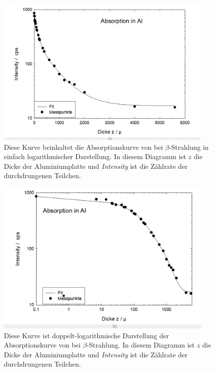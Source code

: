 \documentclass[12pt,english,ngerman]{scrartcl}
\begin{document}
\begin{figure}[H]
	\begin{center}
		\includegraphics[width = 0.95\textwidth]{figures/aluminiumabsorbtion.png}
	\end{center}
	\caption[Absorptionskurve von  bei $\beta$-Strahlung]{Diese Kurve beinhaltet die Absorptionskurve von  bei
		$\beta$-Strahlung in einfach logarithmischer Darstellung.
		In diesem Diagramm ist $z$ die Dicke der Aluminiumplatte und
		\emph{Intensity} ist die Zählrate der durchdrungenen Teilchen.
	}\label{fig:alu_absorption}
\end{figure}

\begin{figure}[H]
	\begin{center}
		\includegraphics[width = 0.95\textwidth]{figures/aluminiumdoppellog.png}
	\end{center}
	\caption[Doppelt-logarithmische Darstellung der Absorptionskurve von 
		bei $\beta$-Strahlung]{Diese Kurve ist doppelt-logarithmische Darstellung der Absorptionskurve von
		 bei $\beta$-Strahlung. In diesem Diagramm ist $z$ die Dicke der
		Aluminiumplatte und \emph{Intensity} ist die Zählrate der durchdrungenen Teilchen.
	}\label{fig:alu_doppellog}
\end{figure}
\end{document}
